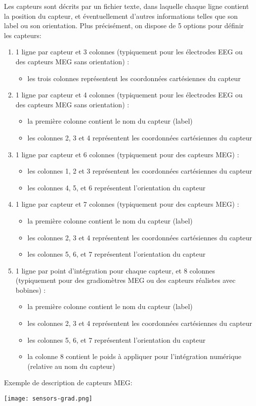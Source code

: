 \noindent
Les capteurs sont décrits par un fichier texte, dans laquelle chaque ligne contient la position du capteur,
et éventuellement d'autres informations telles que son label ou son orientation. Plus précisément, on dispose de 5 options pour définir les capteurs:
\begin{enumerate}
\item  1 ligne par capteur et 3 colonnes (typiquement pour les électrodes EEG ou des capteurs MEG sans orientation) :
	\begin{itemize}
		\item  les trois colonnes représentent les coordonnées cartésiennes du capteur
	\end{itemize}
\item  1 ligne par capteur et 4 colonnes (typiquement pour les électrodes EEG ou des capteurs MEG sans orientation) :
	\begin{itemize}
		\item   la première colonne contient le nom du capteur (label)
		\item les colonnes 2, 3 et 4  représentent les coordonnées cartésiennes du capteur
	\end{itemize}
\item 1 ligne par capteur et 6 colonnes (typiquement pour des capteurs MEG) :
	\begin{itemize}
		\item  les colonnes 1, 2  et 3  représentent les coordonnées cartésiennes du capteur
		\item  les colonnes 4, 5, et 6 représentent l'orientation du capteur 
	\end{itemize}
\item  1 ligne par capteur et 7 colonnes (typiquement pour des capteurs MEG) :
	\begin{itemize}
		\item la première colonne contient le nom du capteur (label)
		\item les colonnes 2, 3  et 4  représentent les coordonnées cartésiennes du capteur
		\item les colonnes 5, 6, et 7 représentent l'orientation du capteur 
	\end{itemize}
\item 1 ligne par point d'intégration pour chaque capteur, et 8 colonnes (typiquement pour des gradiomètres MEG ou des capteurs réalistes avec bobines) :
	\begin{itemize}
		\item  la première colonne contient le nom du capteur (label)
		\item les colonnes 2, 3  et 4  représentent les coordonnées cartésiennes du capteur
		\item  les colonnes 5, 6, et 7 représentent l'orientation du capteur
		\item  la colonne 8 contient le poids à appliquer pour l'intégration numérique (relative au nom du capteur)
	\end{itemize}

\end{enumerate}

Exemple de description de capteurs MEG:




\centerline{\texttt{[image: sensors-grad.png]}}
